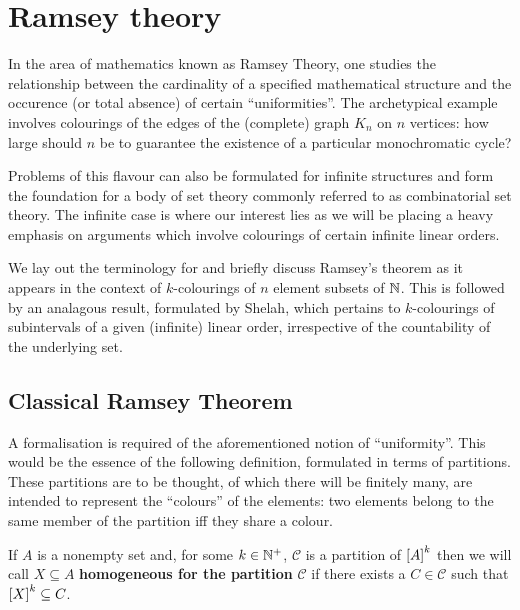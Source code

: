

\chapter{Ramsey theory}

In the area of mathematics known as Ramsey Theory, one studies the relationship
between the cardinality of a specified mathematical structure and the occurence
(or total absence) of certain ``uniformities''.  The archetypical example
involves colourings of the edges of the (complete) graph $K_n$ on $n$ vertices:
how large should $n$ be to guarantee the existence of a particular monochromatic
cycle?

Problems of this flavour can also be formulated for infinite structures and form
the foundation for a body of set theory commonly referred to as combinatorial
set theory.  The infinite case is where our interest lies as we will be placing
a heavy emphasis on arguments which involve colourings of certain infinite
linear orders.

We lay out the terminology for and briefly discuss Ramsey's theorem as it
appears in the context of $k$-colourings of $n$ element subsets of $\nats$.
This is followed by an analagous result, formulated by Shelah, which pertains to
$k$-colourings of subintervals of a given (infinite) linear order, irrespective
of the countability of the underlying set.

\section{Classical Ramsey Theorem}

A formalisation is required of the aforementioned notion of ``uniformity''.
This would be the essence of the following definition, formulated in terms of
partitions.  These partitions are to be thought, of which there will be finitely
many, are intended to represent the ``colours'' of the elements: two elements
belong to the same member of the partition iff they share a colour.

\begin{dfn}
   If $A$ is a nonempty set and, for some $k\in\posnats$, $\mathcal{C}$ is a
   partition of $\subsets{k}{A}$ then we will call $X\subseteq A$
   \textbf{homogeneous for the partition} $\mathcal{C}$ if there exists a $C\in
   \mathcal{C}$ such that $\subsets{k}{X}\subseteq C$.
\end{dfn}


